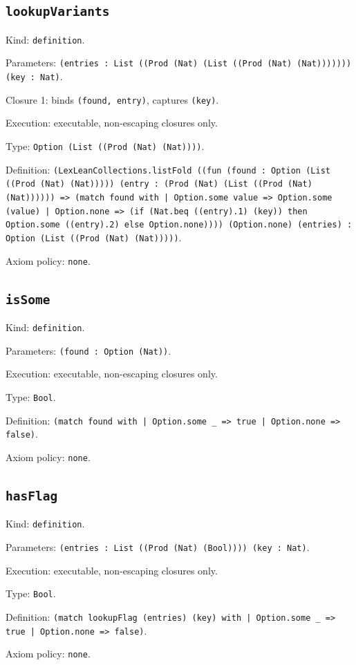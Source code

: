\documentclass[11pt]{article}
\begin{document}
\subsection*{\texttt{lookupVariants}}
\noindent Kind: \texttt{definition}.\par
\noindent Parameters: \texttt{(entries : List ((Prod (Nat) (List ((Prod (Nat) (Nat))))))) (key : Nat)}.\par
\noindent Closure 1: binds \texttt{(found, entry)}, captures \texttt{(key)}.\par
\noindent Execution: executable, non-escaping closures only.\par
\noindent Type: \texttt{Option (List ((Prod (Nat) (Nat))))}.\par
\noindent Definition: \texttt{(LexLeanCollections.listFold ((fun (found : Option (List ((Prod (Nat) (Nat))))) (entry : (Prod (Nat) (List ((Prod (Nat) (Nat)))))) => (match found with | Option.some value => Option.some (value) | Option.none => (if (Nat.beq ((entry).1) (key)) then Option.some ((entry).2) else Option.none)))) (Option.none) (entries) : Option (List ((Prod (Nat) (Nat)))))}.\par
\noindent Axiom policy: \texttt{none}.\par
\subsection*{\texttt{isSome}}
\noindent Kind: \texttt{definition}.\par
\noindent Parameters: \texttt{(found : Option (Nat))}.\par
\noindent Execution: executable, non-escaping closures only.\par
\noindent Type: \texttt{Bool}.\par
\noindent Definition: \texttt{(match found with | Option.some \_ => true | Option.none => false)}.\par
\noindent Axiom policy: \texttt{none}.\par
\subsection*{\texttt{hasFlag}}
\noindent Kind: \texttt{definition}.\par
\noindent Parameters: \texttt{(entries : List ((Prod (Nat) (Bool)))) (key : Nat)}.\par
\noindent Execution: executable, non-escaping closures only.\par
\noindent Type: \texttt{Bool}.\par
\noindent Definition: \texttt{(match lookupFlag (entries) (key) with | Option.some \_ => true | Option.none => false)}.\par
\noindent Axiom policy: \texttt{none}.\par
\end{document}
